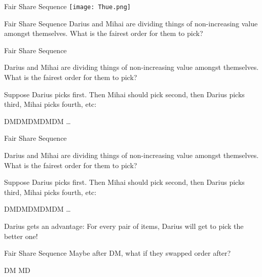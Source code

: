 \documentclass{beamer}
\begin{document}
\begin{frame}{Fair Share Sequence}
    \centering
    \texttt{[image: Thue.png]}
\end{frame}

\begin{frame}[t]{Fair Share Sequence}
    \vspace{30px}
    Darius and Mihai are dividing things of non-increasing value amongst
    themselves. What is the fairest order for them to pick?
\end{frame}

\begin{frame}[t]{Fair Share Sequence}
    \vspace{30pt} 
    
    Darius and Mihai are dividing things of non-increasing value amongst
    themselves. What is the fairest order for them to pick?

    \medskip
    
    Suppose Darius picks first. Then Mihai should pick second, then Darius picks
    third, Mihai picks fourth, etc:

    \medskip
    
    \begin{center}
        DMDMDMDMDM \dots
    \end{center}
\end{frame}

\begin{frame}[t]{Fair Share Sequence}
    \vspace{30pt} 
    
    Darius and Mihai are dividing things of non-increasing value amongst
    themselves. What is the fairest order for them to pick?

    \medskip 
    
    Suppose Darius picks first. Then Mihai should pick second, then Darius picks
    third, Mihai picks fourth, etc:

    \medskip
    
    \begin{center}
        DMDMDMDMDM \dots
    \end{center}

    \medskip

    Darius gets an advantage: For every pair of items, Darius will get to pick
    the better one!

\end{frame}

\begin{frame}[t]{Fair Share Sequence}
    \vspace{30pt}
    Maybe after DM, what if they swapped order after?
    \begin{center}
        DM MD
    \end{center}

\end{frame}
\end{document}
